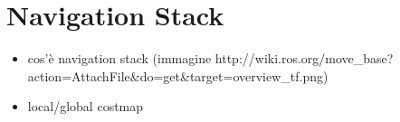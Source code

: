 


\section{Navigation Stack}\label{sec:navigationStack}



\begin{itemize}
	\item cos'è navigation stack (immagine http://wiki.ros.org/move\_base?action=AttachFile\&do=get\&target=overview\_tf.png)
	\item local/global costmap
\end{itemize}









